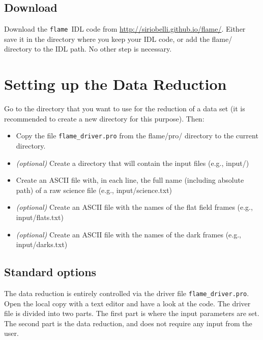 \documentclass[a4paper, notitlepage]{article}
\newcommand{\flame}{\texttt{flame}}
\begin{document}
\subsection{Download}

Download the \flame\ IDL code from \url{http://siriobelli.github.io/flame/}. Either save it in the directory where you keep your IDL code, or add the flame/ directory to the IDL path. No other step is necessary.




\section{Setting up the Data Reduction}

Go to the directory that you want to use for the reduction of a data set (it is recommended to create a new directory for this purpose). Then:
\begin{itemize}
\item Copy the file \texttt{flame\_driver.pro} from the flame/pro/ directory to the current directory.
\item \emph{(optional)} Create a directory that will contain the input files (e.g., input/)
\item Create an ASCII file with, in each line, the full name (including absolute path) of a raw science file (e.g., input/science.txt)
\item \emph{(optional)} Create an ASCII file with the names of the flat field frames (e.g., input/flats.txt)
\item \emph{(optional)} Create an ASCII file with the names of the dark frames (e.g., input/darks.txt)
\end{itemize}


\subsection{Standard options}

The data reduction is entirely controlled via the driver file \texttt{flame\_driver.pro}. Open the local copy with a text editor and have a look at the code. The driver file is divided into two parts. The first part is where the input parameters are set. The second part is the data reduction, and does not require any input from the user.
\end{document}
